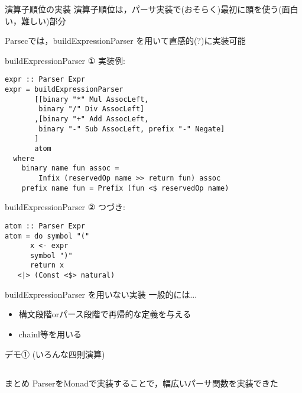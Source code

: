 \documentclass[uplatex,dvipdfmx,ja=standard]{beamer}
\begin{document}
\begin{frame}[fragile]{演算子順位の実装}
    演算子順位は，パーサ実装で(おそらく)最初に頭を使う(面白い，難しい)部分

    Parsecでは，buildExpressionParser を用いて直感的(?)に実装可能
\end{frame}

\begin{frame}[fragile]{buildExpressionParser ①}
    実装例:
    \begin{verbatim}
expr :: Parser Expr
expr = buildExpressionParser
       [[binary "*" Mul AssocLeft, 
        binary "/" Div AssocLeft]
       ,[binary "+" Add AssocLeft, 
        binary "-" Sub AssocLeft, prefix "-" Negate]
       ]
       atom
  where
    binary name fun assoc = 
        Infix (reservedOp name >> return fun) assoc
    prefix name fun = Prefix (fun <$ reservedOp name)
    \end{verbatim}

\end{frame}


\begin{frame}[fragile]{buildExpressionParser ②}
    つづき:
    \begin{verbatim}
atom :: Parser Expr
atom = do symbol "("
      x <- expr
      symbol ")"
      return x
   <|> (Const <$> natural)
    \end{verbatim}
\end{frame}

\begin{frame}[fragile]{buildExpressionParser を用いない実装}
    一般的には...
    \begin{itemize}
    \item 構文段階orパース段階で再帰的な定義を与える
    \item chainl等を用いる
    \end{itemize}
\end{frame}

\begin{frame}{デモ①}
    (いろんな四則演算)
\end{frame}

\subsection{}

\begin{frame}{まとめ}
    ParserをMonadで実装することで，幅広いパーサ関数を実装できた
\end{frame}
\end{document}
